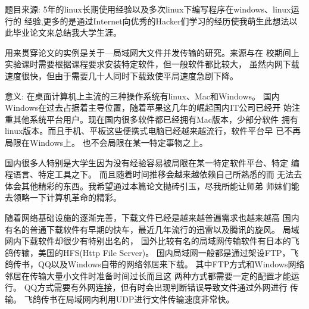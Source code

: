 \documentclass{data/hbue}
\begin{document}


%
\reportabstract
{
\begin{description}
	\item{题目来源:} 
		5年的linux长期使用经验以及多次linux下编写程序在windows、linux运行的
		经验,更多的是通过Internet向优秀的Hacker们学习的经历使我萌生此想法以
		此毕业论文来总结我大学生涯。

		用来贯穿论文的实例是关于---局域网大文件并发传输的研究。来源与在
		校期间上实验课时需要根据课程要求安装特定软件，但一般软件都比较大，
		虽然内网下载速度很快，但由于需要几十人同时下载致使平局速度急剧下降。

	\item{意义:}
		在桌面计算机上主流的三种操作系统有linux、Mac和Windows。
		国内Windows在过去占据着主导位置，随着苹果这几年的崛起国内IT公司已经开
		始注重其他系统平台用户。现在国内很多软件都已经拥有Mac版本，少部分软件
		拥有linux版本。而且手机、平板这些便携式电脑已经越来越流行，软件平台早
		已不再局限在Windows上。 也不会局限在某一特定事物之上。
		
		国内很多人特别是大学生因为没有经验容易被局限在某一特定软件平台、特定
		编程语言、特定工具之下。 而且随着时间推移会越来越依赖自己所熟悉的而
		无法去体会其他精彩的东西。我希望通过本篇论文抛砖引玉，尽我所能让师弟
		师妹们能去领略一下计算机革命的精彩。

\end{description}
}

\reportdescription
{
随着网络基础设施的逐渐完善，下载文件已经是越来越普遍需求也越来越高
国内有名的普通下载软件有早期的快车，最近几年流行的迅雷以及腾讯的旋风。
局域网内下载软件却很少有特别出名的，
国外比较有名的局域网传输软件有日本的飞鸽传输，美国的HFS(Http File Server)。
国内局域网一般都是通过架设FTP，飞鸽传书，QQ以及Windows自带的网络邻居来下载。
其中FTP方式和Windows网络邻居在传输大量小文件时准备时间过长而且这
两种方式都需要一定的配置才能运行。
QQ方式需要有外网连接，但有时会出现判断错误导致文件通过外网进行
传输。
飞鸽传书在局域网内利用UDP进行文件传输速度非常快。
}
\end{document}
